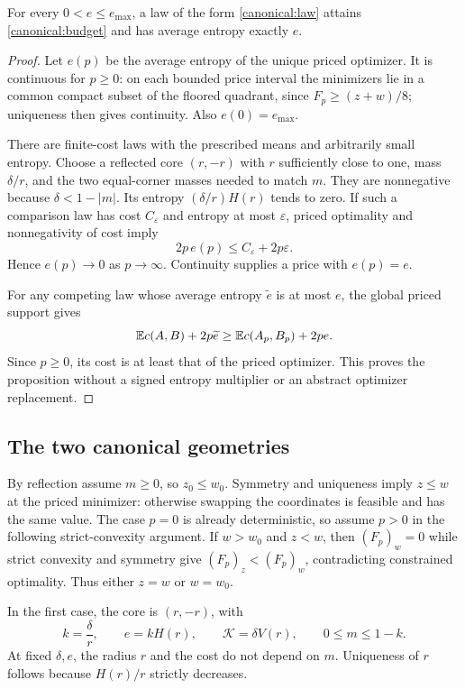 \begin{proposition}
\label{canonical:coverage}
For every $0<e\le e_{\max}$, a law of the form
\eqref{canonical:law} attains \eqref{canonical:budget} and has
average entropy exactly $e$.
\end{proposition}

\begin{proof}
Let $e(p)$ be the average entropy of the unique priced optimizer.
It is continuous for $p\ge0$: on each bounded price interval the
minimizers lie in a common compact subset of the floored quadrant,
since $F_p\ge(z+w)/8$; uniqueness then gives continuity.
Also $e(0)=e_{\max}$.

There are finite-cost laws with the prescribed means and arbitrarily
small entropy.  Choose a reflected core $(r,-r)$ with $r$ sufficiently
close to one, mass $\delta/r$, and the two equal-corner masses needed
to match $m$.  They are nonnegative because
$\delta<1-|m|$.  Its entropy $(\delta/r)H(r)$ tends to zero.
If such a comparison law has cost $C_\varepsilon$ and entropy at most
$\varepsilon$, priced optimality and nonnegativity of cost imply
\[
 2p\,e(p)\le C_\varepsilon+2p\varepsilon.
\]
Hence $e(p)\to0$ as $p\to\infty$.  Continuity supplies a price with
$e(p)=e$.

For any competing law whose average entropy $\widetilde e$ is at
most $e$, the global priced support gives
\[
 \mathbb E c(A,B)+2p\widetilde e
 \ge \mathbb E c(A_p,B_p)+2pe.
\]
Since $p\ge0$, its cost is at least that of the priced optimizer.
This proves the proposition without a signed entropy multiplier or
an abstract optimizer replacement.
\end{proof}

\subsection{The two canonical geometries}

By reflection assume $m\ge0$, so $z_0\le w_0$.  Symmetry and
uniqueness imply $z\le w$ at the priced minimizer: otherwise swapping
the coordinates is feasible and has the same value.
The case $p=0$ is already deterministic, so assume $p>0$ in the
following strict-convexity argument.
If $w>w_0$ and $z<w$, then $(F_p)_w=0$ while strict convexity and
symmetry give $(F_p)_z<(F_p)_w$, contradicting constrained
optimality.  Thus either $z=w$ or $w=w_0$.

In the first case, the core is $(r,-r)$, with
\begin{equation}
 k=\frac{\delta}{r},\qquad
 e=kH(r),\qquad
 \mathcal K=\delta V(r),\qquad 0\le m\le1-k.
 \label{canonical:reflected}
\end{equation}
At fixed $\delta,e$, the radius $r$ and the cost do not depend on
$m$.  Uniqueness of $r$ follows because $H(r)/r$ strictly decreases.

